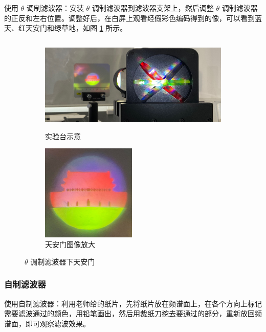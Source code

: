 \documentclass[UTF8]{article}
\theoremstyle{MyLineTheoremStyle} %
\theoremstyle{MyBlockTheoremStyle} %
\theoremstyle{MySubsubsectionStyle} %
\begin{document}
使用 $\theta$ 调制滤波器：安装 $\theta$ 调制滤波器到滤波器支架上，然后调整 $\theta$ 调制滤波器的正反和左右位置。调整好后，在白屏上观看经假彩色编码得到的像，可以看到蓝天、红天安门和绿草地，如图 \ref{调制滤波器下天安门} 所示。
\begin{figure}[H]\centering
\begin{subfigure}[b]{0.66\columnwidth}\centering
    \includegraphics[height=130pt]{assets/3 假彩编码/天安门 红色 实验台.jpg}
    \caption{实验台示意}
\end{subfigure}\hfill
\begin{subfigure}[b]{0.33\columnwidth}\centering
    \includegraphics[height=130pt]{assets/3 假彩编码/天安门 红色.jpg}
    \caption{天安门图像放大}
\end{subfigure}
\caption{$\theta$ 调制滤波器下天安门}
\label{调制滤波器下天安门}
\end{figure}


\vspace*{-7mm}
\subsubsection{自制滤波器}

使用自制滤波器：利用老师给的纸片，先将纸片放在频谱面上，在各个方向上标记需要滤波通过的颜色，用铅笔画出，然后用裁纸刀挖去要通过的部分，重新放回频谱面，即可观察滤波效果。
\end{document}
